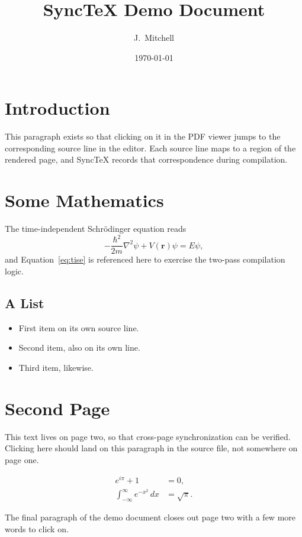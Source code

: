 \documentclass[11pt]{article}
\title{SyncTeX Demo Document}
\author{J.~Mitchell}
\date{\today}
\begin{document}
\maketitle

\section{Introduction}
This paragraph exists so that clicking on it in the PDF viewer
jumps to the corresponding source line in the editor. Each source
line maps to a region of the rendered page, and SyncTeX records
that correspondence during compilation.

\section{Some Mathematics}
The time-independent Schr\"odinger equation reads
\begin{equation}
  -\frac{\hbar^2}{2m}\nabla^2\psi + V(\mathbf{r})\psi = E\psi,
  \label{eq:tise}
\end{equation}
and Equation~\eqref{eq:tise} is referenced here to exercise the
two-pass compilation logic.

\subsection{A List}
\begin{itemize}
  \item First item on its own source line.
  \item Second item, also on its own line.
  \item Third item, likewise.
\end{itemize}

\newpage
\section{Second Page}
This text lives on page two, so that cross-page synchronization
can be verified. Clicking here should land on this paragraph in
the source file, not somewhere on page one.

\begin{align}
  e^{i\pi} + 1 &= 0, \\
  \int_{-\infty}^{\infty} e^{-x^2}\,dx &= \sqrt{\pi}.
\end{align}

The final paragraph of the demo document closes out page two with
a few more words to click on.
\end{document}
